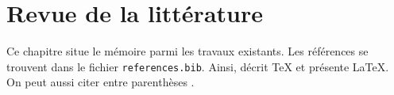 \chapter{Revue de la littérature}
\label{chap:revue}

Ce chapitre situe le mémoire parmi les travaux existants. Les références
se trouvent dans le fichier \texttt{references.bib}. Ainsi,
\textcite{knuth1984} décrit \TeX{} et \textcite{lamport1994} présente
\LaTeX{}. On peut aussi citer entre parenthèses \parencite{mittelbach2023}.
